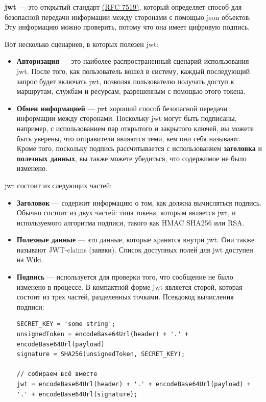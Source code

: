 \textbf{\acrfull{jwt}} --- это открытый стандарт \href{https://tools.ietf.org/html/rfc7519}{(RFC 7519)}, который определяет способ для безопасной передачи информации между сторонами с помощью \acrshort{json} объектов. Эту информацию можно проверить, потому что она имеет цифровую подпись.

Вот несколько сценариев, в которых полезен \acrshort{jwt}:
\begin{itemize}
    \item \textbf{Авторизация} --- это наиболее распространенный сценарий использования \acrshort{jwt}. После того, как пользователь вошел в систему, каждый последующий запрос будет включать \acrshort{jwt}, позволяя пользователю получать доступ к маршрутам, службам и ресурсам, разрешенным с помощью этого токена.
    \item \textbf{Обмен информацией} --- \acrshort{jwt} хороший способ безопасной передачи информации между сторонами. Поскольку \acrshort{jwt} могут быть подписаны, например, с использованием пар открытого и закрытого ключей, вы можете быть уверены, что отправители являются теми, кем они себя называют. Кроме того, поскольку подпись рассчитывается с использованием \textbf{заголовка} и \textbf{полезных данных}, вы также можете убедиться, что содержимое не было изменено.
\end{itemize}

\acrshort{jwt} состоит из следующих частей:
\begin{itemize}
    \item \textbf{Заголовок} ---  содержит информацию о том, как должна вычисляться подпись. Обычно состоит из двух частей: типа токена, которым является \acrshort{jwt}, и используемого алгоритма подписи, такого как HMAC SHA256 или RSA.
    \item \textbf{Полезные данные} --- это данные, которые хранятся внутри \acrshort{jwt}. Они также называют JWT-claims (заявки). Список доступных полей для \acrshort{jwt} доступен на \href{https://en.wikipedia.org/wiki/JSON_Web_Token#Standard_fields}{Wiki}.
    \item \textbf{Подпись} --- используется для проверки того, что сообщение не было изменено в процессе. В компактной форме \acrshort{jwt} является сторой, которая состоит из трех частей, разделенных точками. Псевдокод вычисления подписи:
    \begin{noerr}
    \begin{verbatim}
SECRET_KEY = 'some string';
unsignedToken = encodeBase64Url(header) + '.' + encodeBase64Url(payload)
signature = SHA256(unsignedToken, SECRET_KEY);

// собираем всё вместе
jwt = encodeBase64Url(header) + '.' + encodeBase64Url(payload) + '.' + encodeBase64Url(signature);
    \end{verbatim}
    \end{noerr}
\end{itemize}

